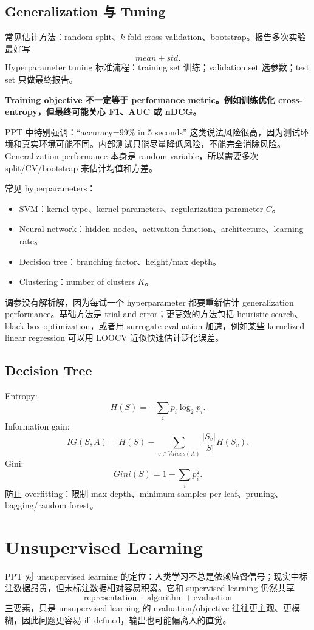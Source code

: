 \documentclass[UTF8,11pt,a4paper]{ctexart}
\newcommand{\warn}[1]{\textbf{\color{red!60!black}#1}}
\begin{document}
\subsection{Generalization 与 Tuning}

常见估计方法：random split、$k$-fold cross-validation、bootstrap。报告多次实验最好写
\[
mean\pm std.
\]
Hyperparameter tuning 标准流程：training set 训练；validation set 选参数；test set 只做最终报告。

\warn{Training objective 不一定等于 performance metric。例如训练优化 cross-entropy，但最终可能关心 F1、AUC 或 nDCG。}

PPT 中特别强调：``accuracy=99\% in 5 seconds'' 这类说法风险很高，因为测试环境和真实环境可能不同。内部测试只能尽量降低风险，不能完全消除风险。Generalization performance 本身是 random variable，所以需要多次 split/CV/bootstrap 来估计均值和方差。

常见 hyperparameters：
\begin{itemize}
\item SVM：kernel type、kernel parameters、regularization parameter $C$。
\item Neural network：hidden nodes、activation function、architecture、learning rate。
\item Decision tree：branching factor、height/max depth。
\item Clustering：number of clusters $K$。
\end{itemize}

调参没有解析解，因为每试一个 hyperparameter 都要重新估计 generalization performance。基础方法是 trial-and-error；更高效的方法包括 heuristic search、black-box optimization，或者用 surrogate evaluation 加速，例如某些 kernelized linear regression 可以用 LOOCV 近似快速估计泛化误差。

\subsection{Decision Tree}

Entropy:
\[
H(S)=-\sum_i p_i\log_2p_i.
\]
Information gain:
\[
IG(S,A)=H(S)-\sum_{v\in Values(A)}\frac{|S_v|}{|S|}H(S_v).
\]
Gini:
\[
Gini(S)=1-\sum_i p_i^2.
\]
防止 overfitting：限制 max depth、minimum samples per leaf、pruning、bagging/random forest。

\section{Unsupervised Learning}

PPT 对 unsupervised learning 的定位：人类学习不总是依赖监督信号；现实中标注数据昂贵，但未标注数据相对容易积累。它和 supervised learning 仍然共享
\[
\text{representation}+\text{algorithm}+\text{evaluation}
\]
三要素，只是 unsupervised learning 的 evaluation/objective 往往更主观、更模糊，因此问题更容易 ill-defined，输出也可能偏离人的直觉。
\end{document}
